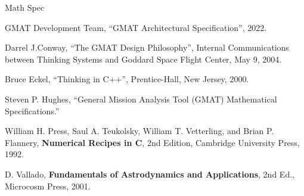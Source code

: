 \documentclass[letterpaper,10pt]{book}
\begin{document}
%


% 
\backmatter


\begin{thebibliography}{Math  Spec} %

 GMAT Development Team, ``GMAT Architectural Specification'', 2022.

 Darrel J.Conway, ``The GMAT Design Philosophy'', Internal
Communications between Thinking Systems and Goddard Space Flight Center, May 9, 2004.

Bruce Eckel, ``Thinking in C++'', Prentice-Hall, New Jersey, 2000.

 Steven P. Hughes, ``General Mission Analysis Tool (GMAT) Mathematical
Specifications.''

 William H. Press, Saul A. Teukolsky, William T. Vetterling, and Brian
P. Flannery, \textbf{Numerical Recipes in C}, 2nd Edition, Cambridge University Press, 1992.

D. Vallado, \textbf{Fundamentals of Astrodynamics and Applications},
2nd Ed., Microcosm Press, 2001.

\end{thebibliography}

\printindex
\end{document}
